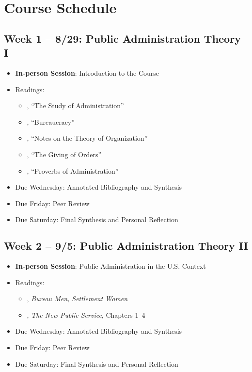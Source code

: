 \documentclass[12pt, letterpaper]{article}
\begin{document}
\section{Course Schedule}

\subsection*{Week 1 -- 8/29: Public Administration Theory I}
\begin{itemize}
    \item \textbf{In-person Session}: Introduction to the Course
    \item Readings:
        \begin{itemize}
            \item \citet{Wilson1887}, ``The Study of Administration''
            \item \citet{Weber1946}, ``Bureaucracy'' 
            \item \citet{gulick1937}, ``Notes on the Theory of Organization'' 
            \item \citet{Follett1926}, ``The Giving of Orders'' 
            \item \citet{simon1946}, ``Proverbs of Administration'' 
        \end{itemize}
    \item Due Wednesday: Annotated Bibliography and Synthesis
    \item Due Friday: Peer Review
    \item Due Saturday: Final Synthesis and Personal Reflection
\end{itemize}


\subsection*{Week 2 -- 9/5: Public Administration Theory II}
\begin{itemize}
    \item \textbf{In-person Session}: Public Administration in the U.S. Context
    \item Readings:
        \begin{itemize}
            \item \citet{Stivers2000}, \emph{Bureau Men, Settlement Women} 
            \item \citet{Denhardt2015}, \emph{The New Public Service}, Chapters 1--4 
        \end{itemize}
        \item Due Wednesday: Annotated Bibliography and Synthesis
        \item Due Friday: Peer Review
        \item Due Saturday: Final Synthesis and Personal Reflection
\end{itemize}
\end{document}
